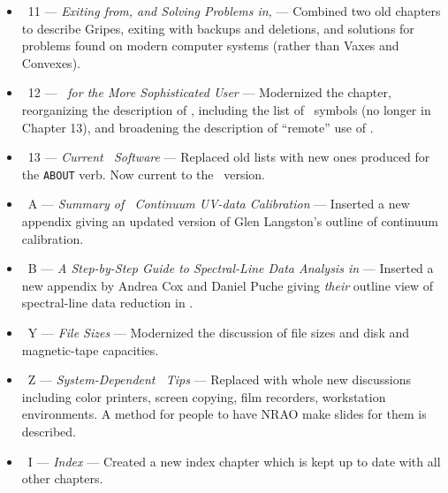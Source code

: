\begin{itemize}
\item\ 11 --- {\it Exiting from, and Solving Problems in, \AIPS} ---
   Combined two old chapters to describe Gripes, exiting with backups
   and deletions, and solutions for problems found on modern computer
   systems (rather than Vaxes and Convexes).
\item\ 12 --- {\it \AIPS\ for the More Sophisticated User} ---
   Modernized the chapter, reorganizing the description of \POPS,
   including the list of \POPS\ symbols (no longer in Chapter 13), and
   broadening the description of ``remote'' use of \hbox{\AIPS}.
\item\ 13 --- {\it Current \AIPS\ Software} --- Replaced old lists with
   new ones produced for the {\tt ABOUT} verb.  Now current to the
   \RELEASENAME\ version.
\item\ A --- {\it Summary of \AIPS\ Continuum UV-data Calibration} ---
   Inserted a new appendix giving an updated version of Glen
   Langston's outline of continuum calibration.
\item\ B --- {\it A Step-by-Step Guide to Spectral-Line Data Analysis
   in \AIPS} --- Inserted a new appendix by Andrea Cox and Daniel
   Puche giving {\it their} outline view of spectral-line data
   reduction in \hbox{\AIPS}.
\item\ Y --- {\it File Sizes} --- Modernized the discussion of file
   sizes and disk and magnetic-tape capacities.
\item\ Z --- {\it System-Dependent \AIPS\ Tips} --- Replaced with whole
   new discussions including color printers, screen copying, film
   recorders, workstation environments.  A method for people to have
   NRAO make slides for them is described.
\item\ I --- {\it Index} --- Created a new index chapter which is kept
   up to date with all other chapters.
\end{itemize}
\vfill\eject

\centerline{\hss{}\hss}



